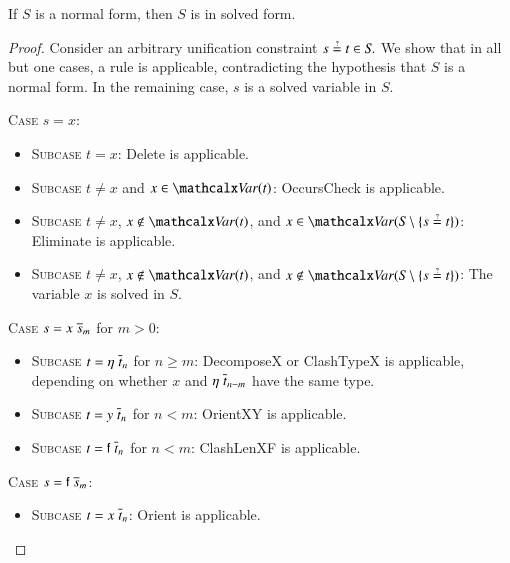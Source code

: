   \begin{lemma}\label{lemma:ehoh:unif-normal-imp-solved}
    If $\mathit{S}$ is a normal form, then $\mathit{S}$ is in solved form.
  \end{lemma}
  \begin{proof}
    Consider an arbitrary unification constraint $s \unif t \in \mathit{S}.$ We show
    that in all but one cases, a rule is applicable, contradicting the
    hypothesis that $\mathit{S}$ is a normal form. In the remaining case, $s$ is a
    solved variable in $\mathit{S}$.

    \medskip
    \noindent
    \textsc{Case} $s = x$:
    \begin{itemize}
    \item \textsc{Subcase} $t = x$:
      \textsf{Delete} is applicable.

    \item \textsc{Subcase} $t \neq x$ and $x \in \Var(t)$:
      \textsf{OccursCheck} is applicable.

    \item \textsc{Subcase} $t \neq x$, $x \not \in \Var(t)$, and $x \in
      \Var(\mathit{S} \setminus \{ s \unif t \})$:
      \textsf{Eliminate} is applicable.

    \item \textsc{Subcase} $t \neq x$, $x \not \in \Var(t)$,
          and $x \notin \Var(\mathit{S} \setminus \{ s \unif t \})$:
      The variable $x$ is solved in $\mathit{S}$.
    \end{itemize}

    \noindent
    \textsc{Case} $s = x \; \overline{s}_{m}$ for $m > 0$:
    \begin{itemize}
    \item \textsc{Subcase} $t = \eta \; \overline{t}_{n}$ for $n \ge m$:
      \textsf{DecomposeX} or \textsf{Clash\-TypeX} is applicable, depending on
      whether $x$ and $\eta \; \overline{t}_{{n-m}}$ have the same type.

    \item \textsc{Subcase} $t = y \; \overline{t}_{n}$ for $n < m$:
      \textsf{OrientXY} is applicable.

    \item \textsc{Subcase} $t = \mathsf{f} \; \overline{t}_{n}$ for $n < m$:
      \textsf{ClashLenXF} is applicable.
    \end{itemize}

    \noindent
    \textsc{Case} $s = \mathsf{f} \; \overline{s}_{m}$:
    \begin{itemize}
    \item \textsc{Subcase} $t = x \; \overline{t}_{n}$:
      \textsf{Orient} is applicable.


\end{itemize}
\end{proof}
